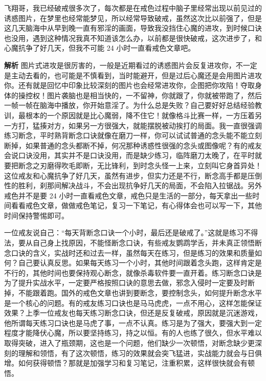 \begin{case}[不是口诀没用]
    飞翔哥，我已经破戒很多次了，每次都是在戒色过程中脑子里经常出现以前见过的诱惑图片，在梦里也经常能梦见，所以经常导致破戒，虽然这次比以前强了，但是这几天脑海中从早到晚一直有邪淫的画面，导致我没挡住心魔的进攻，到时候口诀也没用，遇到这种情况我真不知道该怎么办，以前都是很快破戒，这次进步了，和心魔抗争了好几天，但我不可能 24 小时一直看戒色文章吧。

    \textbf{解析} 图片式进攻是很厉害的，一般是近期看过的诱惑图片会反复进攻你，不一定是主动去看的，也可能是不慎看到，当时能避开，但是过后心魔还是会用图片进攻你。还有就是回忆中印象比较深刻的图片也会经常进攻你，企图把你攻陷！夺取身体的操控权！图片袭脑也是相当快的，一不留神，你就跟了，你就被带跑了，然后一帧一帧在脑海中播放，你开始意淫了。为什么总是失败？自己要好好总结经验教训，最根本的一个原因就是比心魔弱，降不住它！就像格斗比赛一样，一方压着另一方打，猛揍对方，如果另一方很强大，就能摆脱被动挨打的局面。我一直很强调练习断念，平时熟背断念口诀就像在磨刀一样，你可以试试普通的念头能不能立刻断掉，如果普通的念头都断不掉，何况那种诱惑性很强的念头或图像呢？有的戒友会说口诀没用，其实并不是口诀没用，而是缺少练习，临阵磨刀太晚了，在平时就要把断念之刃磨得吹毛即断，无比锋利，到时念头怪一上来，立刻叫它身首异处！这位戒友和心魔抗争了好几天，虽然有进步，但实力还是不行，断念高手都是压倒性的胜利，刹那间解决战斗，不会出现抗争好几天的局面，不会陷入拉锯战。另外戒色并不是要 24 小时一直看戒色文章，戒色只是生活的一部分，每天拿出一些时间看看戒色文章，做做戒色笔记，复习一下笔记，有心得体会也可以写一下，其他时间保持警惕即可。

    一位戒友说自己：“每天背断念口诀一个小时，最后还是破戒了。”这就是练习不得法，要从自己身上找原因，不能怪断念口诀，有些戒友鹦鹉学舌，并未真正领悟断念口诀的含义，实战时还和过去一样，虽然每天在练习，但是练习的效果和质量如何？自己要认真反思。如果每天练习一个小时，其他时间跟着念头跑，这样肯定是不行的，其他时间也要保持观心断念，就像杀毒软件要一直开着。练习断念口诀是为了提升实战水平，一定要严格按照口诀的意思去做，邪念入侵时一定要及时断掉，不能跟着跑。国外的戒色文章也讲到要断念，要控制念头，如何提升断念水平是一个核心的问题。有的戒友练习口诀也是马马虎虎，一点不用心，这样怎能保证效果？上季一位戒友也每天练习断念口诀，但还是反复破戒，原因就是沉迷游戏，他所谓每天练习口诀也是马虎了事，一点不认真。练习是为了强大，要强大到一定程度才能降伏心魔，所以要坚持练习，持之以恒。有的人也练了很久，但水平难以取得突破，进入了瓶颈期，这也是一个问题，他们缺少一次顿悟，对断念缺少更深刻的理解和领悟，有了这次顿悟，练习的效果就会突飞猛进，实战能力就会与日俱增。如何获得顿悟？那就是加强学习和复习笔记，注重积累，这样很快就会有顿悟。


\end{case}
